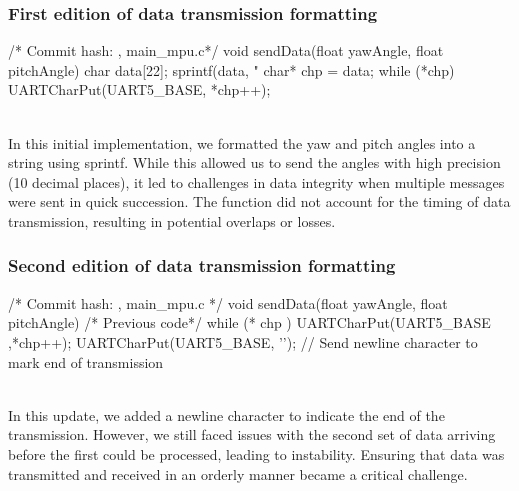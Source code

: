 \documentclass[12pt, a4paper]{article}
\begin{document}
\subsubsection{First edition of data transmission formatting}\text{}
\begin{code}
/* Commit hash: , main_mpu.c*/
void sendData(float yawAngle, float pitchAngle) {
    char data[22];
    sprintf(data, "%
    char* chp = data;
    while (*chp) 
        UARTCharPut(UART5_BASE, *chp++);
}
\end{code}\text{}\\
In this initial implementation, we formatted the yaw and pitch angles into a string using sprintf. 
While this allowed us to send the angles with high precision (10 decimal places), 
it led to challenges in data integrity when multiple messages were sent in quick succession. 
The function did not account for the timing of data transmission, resulting in potential overlaps 
or losses.
\subsubsection{Second edition of data transmission formatting}\text{}
\begin{code}
/* Commit hash: , main_mpu.c */
void sendData(float yawAngle, float pitchAngle) {
    /* Previous code*/
    while (* chp )
        UARTCharPut(UART5_BASE ,*chp++);
    UARTCharPut(UART5_BASE, '\n'); // Send newline character to mark end of transmission
}
\end{code}
\textbf{}\\
In this update, we added a newline character to indicate the end of the transmission. 
However, we still faced issues with the second set of data arriving before the first could 
be processed, leading to instability. Ensuring that data was transmitted and received in an 
orderly manner became a critical challenge.
\end{document}
